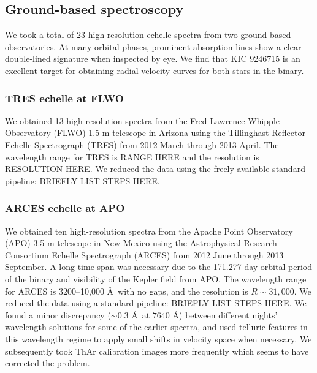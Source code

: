 

\subsection{Ground-based spectroscopy}\label{spectra}
We took a total of 23 high-resolution echelle spectra from two ground-based observatories. At many orbital phases, prominent absorption lines show a clear double-lined signature when inspected by eye. We find that KIC 9246715 is an excellent target for obtaining radial velocity curves for both stars in the binary.

	\subsubsection{TRES echelle at FLWO}\label{tres}
We obtained 13 high-resolution spectra from the Fred Lawrence Whipple Observatory (FLWO) 1.5 m telescope in Arizona using the Tillinghast Reflector Echelle Spectrograph (TRES) from 2012 March through 2013 April. The wavelength range for TRES is RANGE HERE and the resolution is RESOLUTION HERE. We reduced the data using the freely available standard pipeline: BRIEFLY LIST STEPS HERE.

	\subsubsection{ARCES echelle at APO}\label{arces}
We obtained ten high-resolution spectra from the Apache Point Observatory (APO) 3.5 m telescope in New Mexico using the Astrophysical Research Consortium Echelle Spectrograph (ARCES) from 2012 June through 2013 September. A long time span was necessary due to the 171.277-day orbital period of the binary and visibility of the Kepler field from APO. The wavelength range for ARCES is 3200--10,000 \AA \ with no gaps, and the resolution is $R \sim 31,000$. We reduced the data using a standard pipeline: BRIEFLY LIST STEPS HERE. We found a minor discrepancy ($\sim 0.3$ \AA \ at $7640$ \AA) between different nights' wavelength solutions for some of the earlier spectra, and used telluric features in this wavelength regime to apply small shifts in velocity space when necessary. We subsequently took ThAr calibration images more frequently which seems to have corrected the problem.

